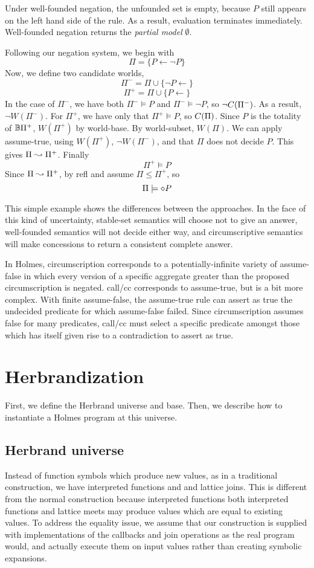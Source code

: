 Under well-founded negation, the unfounded set is empty, because $P$ still appears on the left hand side of the rule.
As a result, evaluation terminates immediately.
Well-founded negation returns the \emph{partial model} $\emptyset$.

Following our negation system, we begin with
\[\Pi = \{P \leftarrow \neg P\}\]
Now, we define two candidate worlds,
\[\Pi^- = \Pi \cup \{\neg P \leftarrow\}\]
\[\Pi^+ = \Pi \cup \{P \leftarrow\}\]
In the case of $\Pi^-$, we have both $\Pi^- \models P$ and $\Pi^- \models \neg P$, so $\neg C(\Pi^-)$.
As a result, $\neg W(\Pi^-)$.
For $\Pi^+$, we have only that $\Pi^+ \models P$, so $C(\Pi)$.
Since $P$ is the totality of $\mathbb{B}{\Pi^+}$, $W(\Pi^+)$ by world-base.
By world-subset, $W(\Pi)$.
We can apply assume-true, using $W(\Pi^+)$, $\neg W(\Pi^-)$, and that $\Pi$ does not decide $P$.
This gives $\Pi \leadsto \Pi^+$.
Finally
\[
	\Pi^+ \models P
\]
Since $\Pi \leadsto \Pi^+$, by refl and assume $\Pi \leq \Pi^+$, so
\[
	\Pi \models \diamond P
\]

This simple example shows the differences between the approaches.
In the face of this kind of uncertainty, stable-set semantics will choose not to give an answer, well-founded semantics will not decide either way, and circumscriptive semantics will make concessions to return a consistent complete answer. 

In Holmes, circumscription corresponds to a potentially-infinite variety of assume-false in which every version of a specific aggregate greater than the proposed circumscription is negated.
call/cc corresponds to assume-true, but is a bit more complex.
With finite assume-false, the assume-true rule can assert as true the undecided predicate for which assume-false failed.
Since circumscription assumes false for many predicates, call/cc must select a specific predicate amongst those which has itself given rise to a contradiction to assert as true.

\section{Herbrandization}
\label{formal:sec:herbrand}
First, we define the Herbrand universe and base.
Then, we describe how to instantiate a Holmes program at this universe.

\subsection{Herbrand universe}
\label{formal:sec:callbacks}
Instead of function symbols which produce new values, as in a traditional construction, we have interpreted functions and and lattice joins.
This is different from the normal construction because interpreted functions both interpreted functions and lattice meets may produce values which are equal to existing values.
To address the equality issue, we assume that our construction is supplied with implementations of the callbacks and join operations as the real program would, and actually execute them on input values rather than creating symbolic expansions.

